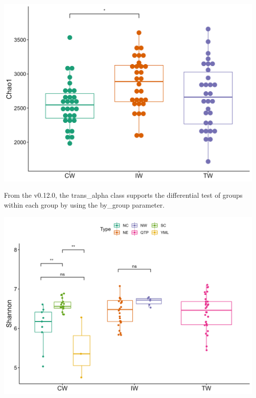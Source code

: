 \documentclass[
]{book}
\newenvironment{Shaded}{\begin{snugshade}}{\end{snugshade}}
\newcommand{\AttributeTok}[1]{\textcolor[rgb]{0.77,0.63,0.00}{#1}}
\newcommand{\FunctionTok}[1]{\textcolor[rgb]{0.00,0.00,0.00}{#1}}
\newcommand{\NormalTok}[1]{#1}
\newcommand{\OtherTok}[1]{\textcolor[rgb]{0.56,0.35,0.01}{#1}}
\newcommand{\SpecialCharTok}[1]{\textcolor[rgb]{0.00,0.00,0.00}{#1}}
\newcommand{\StringTok}[1]{\textcolor[rgb]{0.31,0.60,0.02}{#1}}
\begin{document}
\begin{center}\includegraphics[width=600px]{Images/trans_alpha_wilcox_nons} \end{center}

From the v0.12.0, the trans\_alpha class supports the differential test of groups within each group by using the by\_group parameter.

\begin{Shaded}
\end{Shaded}

\begin{center}\includegraphics[width=600px]{Images/plot_alpha_wilcox_bygroup} \end{center}
\end{document}
